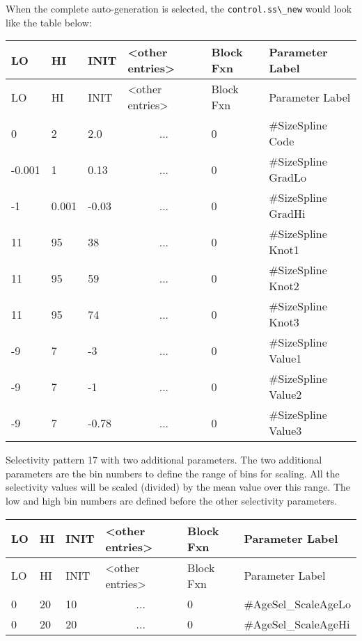 When the complete auto-generation is selected, the \verb|control.ss\_new| would look like the table below:	

\begin{longtable}{p{1cm} p{1cm} p{1cm} p{2.9cm} p{1.9cm} p{4.2cm}}
	\hline
	LO \Tstrut & HI & INIT & <other entries> & Block Fxn & Parameter Label \Bstrut\\
	\hline
	\endfirsthead

	\hline
	LO \Tstrut & HI & INIT & <other entries> & Block Fxn & Parameter Label \Bstrut\\
	\hline
	\endhead

	0 \Tstrut &		2 &   2.0 & \multicolumn{1}{c}{...} & 0 & \#SizeSpline Code \\
	-0.001    &		1 &  0.13 & \multicolumn{1}{c}{...} & 0 & \#SizeSpline GradLo \\
	-1        & 0.001 & -0.03 & \multicolumn{1}{c}{...} & 0 & \#SizeSpline GradHi \\
	11        &	   95 & 	38 & \multicolumn{1}{c}{...} & 0 & \#SizeSpline Knot1 \\
	11        &	   95 & 	59 & \multicolumn{1}{c}{...} & 0 & \#SizeSpline Knot2 \\
	11        &	   95 & 	74 & \multicolumn{1}{c}{...} & 0 & \#SizeSpline Knot3 \\
	-9        & 	7 & 	-3 & \multicolumn{1}{c}{...} & 0 & \#SizeSpline Value1 \\
	-9        &		7 & 	-1 & \multicolumn{1}{c}{...} & 0 & \#SizeSpline Value2 \\
	-9        &		7 & -0.78 & \multicolumn{1}{c}{...} & 0 & \#SizeSpline Value3 \Bstrut\\
	\hline
\end{longtable}


Selectivity pattern 17 with two additional parameters. The two additional parameters are the bin numbers to define the range of bins for scaling. All the selectivity values will be scaled (divided) by the mean value over this range. The low and high bin numbers are defined before the other selectivity parameters.

	\begin{longtable}{p{1cm} p{1cm} p{1cm} p{2.9cm} p{1.9cm} p{4.2cm}}
		\hline
		LO \Tstrut & HI & INIT & <other entries> & Block Fxn & Parameter Label \Bstrut\\
		\hline
		\endfirsthead
	
		\hline
		LO \Tstrut & HI & INIT & <other entries> & Block Fxn & Parameter Label \Bstrut\\
		\hline
		\endhead

		0 & 20 & 10 & \multicolumn{1}{c}{...} & 0 & \#AgeSel\_ScaleAgeLo \Tstrut\\
		0 & 20 & 20 & \multicolumn{1}{c}{...} & 0 & \#AgeSel\_ScaleAgeHi \Bstrut\\
		\hline
	\end{longtable}


